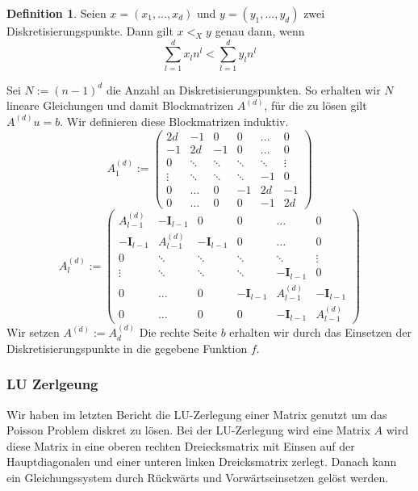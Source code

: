 \documentclass[smallheadings]{scrartcl}
\theoremstyle{definition}
\newtheorem{definition}{Definition}[section]
\begin{document}
		\begin{definition}
		Seien $x=(x_1,...,x_d)$ und $y=(y_1,...,y_d)$ zwei Diskretisierungspunkte. Dann gilt $x <_X y$ genau dann, wenn
		$$\sum_{l=1}^dx_ln^l<\sum_{l=1}^dy_ln^l$$
		\end{definition}
		Sei $N:=(n-1)^d$ die Anzahl an Diskretisierungspunkten.
		So erhalten wir $N$ lineare Gleichungen und damit Blockmatrizen $A^{(d)}$, für die zu lösen gilt $A^{(d)}u=b$. Wir definieren diese Blockmatrizen induktiv.
		$$A^{(d)}_{1} := \begin{pmatrix}     2d & -1 & 0 & 0 &\dots&0 \\    -1 & 2d & -1 & 0&\dots&0 \\    0&\ddots&\ddots&\ddots&\ddots&\vdots\\    \vdots & \ddots &\ddots&\ddots&-1&0 \\    0 & \dots&0&-1&2d&-1\\     0&  \dots&0&0&-1&2d    \end{pmatrix}$$
		$$A^{(d)}_{l} := \begin{pmatrix}     A^{(d)}_{l-1} & -\mathbf{I}_{l-1} & 0 & 0 &\dots&0 \\    -\mathbf{I}_{l-1} & A^{(d)}_{l-1} & -\mathbf{I}_{l-1} & 0&\dots&0 \\    0&\ddots&\ddots&\ddots&\ddots&\vdots\\    \vdots & \ddots &\ddots&\ddots&-\mathbf{I}_{l-1}&0 \\    0 & \dots&0&-\mathbf{I}_{l-1}&A^{(d)}_{l-1}&-\mathbf{I}_{l-1}\\     0&  \dots&0&0&-\mathbf{I}_{l-1}&A^{(d)}_{l-1}    \end{pmatrix}$$
		Wir setzen $A^{(d)}:=A^{(d)}_d$ Die rechte Seite $b$ erhalten wir durch das Einsetzen der Diskretisierungspunkte in die gegebene Funktion $f$. \cbend
		\subsubsection{LU Zerlgeung}
		Wir haben im letzten Bericht die LU-Zerlegung einer Matrix genutzt um das Poisson Problem diskret zu lösen. 
		Bei der LU-Zerlegung wird eine Matrix $A$ wird diese Matrix in eine  oberen rechten Dreiecksmatrix mit Einsen auf der Hauptdiagonalen und einer unteren linken Dreicksmatrix zerlegt.  Danach kann ein Gleichungssystem durch Rückwärts und Vorwärtseinsetzen gelöst werden.  
\end{document}
